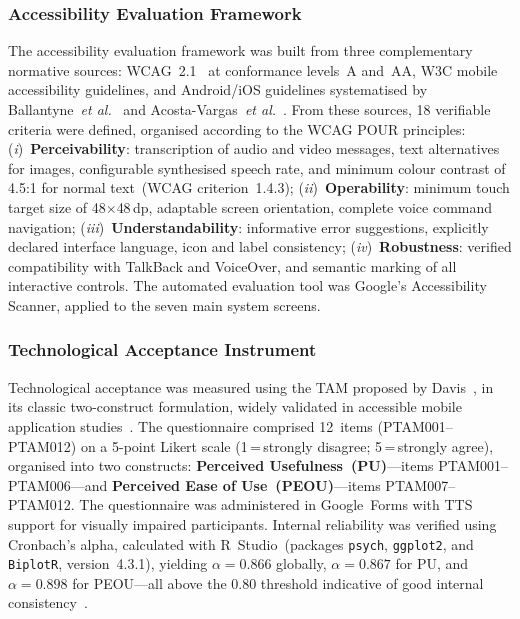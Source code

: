 \documentclass[journal]{IEEEtran}
\begin{document}
	\subsubsection{Accessibility Evaluation Framework}
	The accessibility evaluation framework was built from three
	complementary normative sources: WCAG~2.1~\cite{w3c2018} at
	conformance levels~A and~AA, W3C mobile accessibility guidelines,
	and Android/iOS guidelines systematised by
	Ballantyne~\textit{et al.}~\cite{ballantyne2018} and
	Acosta-Vargas~\textit{et al.}~\cite{acosta2021}.
	From these sources, 18 verifiable criteria were defined,
	organised according to the WCAG POUR principles:
	(\textit{i})~\textbf{Perceivability}: transcription of audio and
	video messages, text alternatives for images, configurable
	synthesised speech rate, and minimum colour contrast of 4.5:1
	for normal text~(WCAG criterion~1.4.3);
	(\textit{ii})~\textbf{Operability}: minimum touch target size of
	48$\times$48\,dp, adaptable screen orientation, complete voice
	command navigation;
	(\textit{iii})~\textbf{Understandability}: informative error
	suggestions, explicitly declared interface language, icon and
	label consistency;
	(\textit{iv})~\textbf{Robustness}: verified compatibility with
	TalkBack and VoiceOver, and semantic marking of all interactive
	controls.
	The automated evaluation tool was Google's Accessibility Scanner,
	applied to the seven main system screens.
	
	\subsubsection{Technological Acceptance Instrument}
	Technological acceptance was measured using the TAM proposed by
	Davis~\cite{davis1989}, in its classic two-construct formulation,
	widely validated in accessible mobile application
	studies~\cite{kim2024,holden2010}.
	The questionnaire comprised 12~items (PTAM001--PTAM012) on a
	5-point Likert scale (1\,=\,strongly disagree;
	5\,=\,strongly agree), organised into two constructs:
	\textbf{Perceived Usefulness~(PU)}---items PTAM001--PTAM006---and
	\textbf{Perceived Ease of Use~(PEOU)}---items
	PTAM007--PTAM012.
	The questionnaire was administered in Google~Forms with TTS support
	for visually impaired participants.
	Internal reliability was verified using Cronbach's alpha,
	calculated with R~Studio~(packages \texttt{psych}, \texttt{ggplot2},
	and \texttt{BiplotR}, version~4.3.1), yielding
	$\alpha{=}0.866$ globally, $\alpha{=}0.867$ for PU, and
	$\alpha{=}0.898$ for PEOU---all above the 0.80 threshold
	indicative of good internal
	consistency~\cite{nunnally1978}.
	
\end{document}

